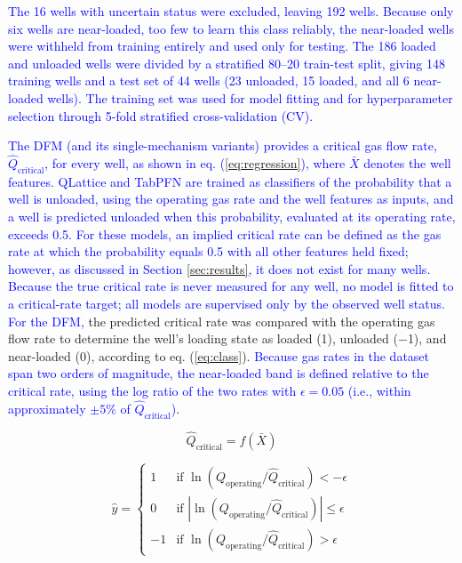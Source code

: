 \documentclass[journal=jacsat,manuscript=article]{achemso}
\newcommand{\al}{\textcolor{blue}}
\theoremstyle{thmstyleone}%
\theoremstyle{thmstyletwo}%
\theoremstyle{thmstylethree}%
\begin{document}
\al{The 16 wells with uncertain status were excluded, leaving 192 wells. Because only six wells are near-loaded, too few to learn this class reliably, the near-loaded wells were withheld from training entirely and used only for testing. The 186 loaded and unloaded wells were divided by a stratified 80--20 train-test split, giving 148 training wells and a test set of 44 wells (23 unloaded, 15 loaded, and all 6 near-loaded wells). The training set was used for model fitting and for hyperparameter selection through 5-fold stratified cross-validation (CV).}

\al{The DFM (and its single-mechanism variants) provides a critical gas flow rate, $\hat Q_{\text{critical}}$, for every well, as shown in eq. (\ref{eq:regression}), where $\bar X$ denotes the well features. QLattice and TabPFN are trained as classifiers of the probability that a well is unloaded, using the operating gas rate and the well features as inputs, and a well is predicted unloaded when this probability, evaluated at its operating rate, exceeds 0.5. For these models, an implied critical rate can be defined as the gas rate at which the probability equals 0.5 with all other features held fixed; however, as discussed in Section \ref{sec:results}, it does not exist for many wells. Because the true critical rate is never measured for any well, no model is fitted to a critical-rate target; all models are supervised only by the observed well status.} \al{For the DFM,} the predicted critical rate was compared with the operating gas flow rate to determine the well's loading state as loaded (1), unloaded ($-$1), and near-loaded (0), according to eq. (\ref{eq:class}). \al{Because gas rates in the dataset span two orders of magnitude, the near-loaded band is defined relative to the critical rate, using the log ratio of the two rates with $\epsilon = 0.05$ (i.e., within approximately $\pm 5\%$ of $\hat Q_{\text{critical}}$).}

\begin{equation}
\hat Q_{\text{critical}} = f(\bar X)
\label{eq:regression}
\end{equation}

\begin{equation}
\hat y =
\begin{cases}
1 & \text{if } \ln\left(Q_{\text{operating}}/\hat Q_{\text{critical}}\right) < -\epsilon \\
0 & \text{if } \left\lvert \ln\left(Q_{\text{operating}}/\hat Q_{\text{critical}}\right) \right\rvert \leq \epsilon \\
-1 & \text{if } \ln\left(Q_{\text{operating}}/\hat Q_{\text{critical}}\right) > \epsilon
\end{cases}
\label{eq:class}
\end{equation}
\end{document}
